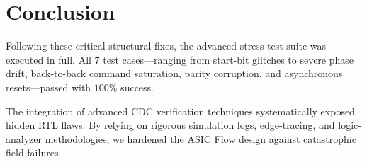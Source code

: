 \documentclass[11pt,a4paper]{article}
\begin{document}
\section{Conclusion}
Following these critical structural fixes, the advanced stress test suite was executed in full. All 7 test cases---ranging from start-bit glitches to severe phase drift, back-to-back command saturation, parity corruption, and asynchronous resets---passed with $100\%$ success. 

The integration of advanced CDC verification techniques systematically exposed hidden RTL flaws. By relying on rigorous simulation logs, edge-tracing, and logic-analyzer methodologies, we hardened the ASIC Flow design against catastrophic field failures.
\end{document}
